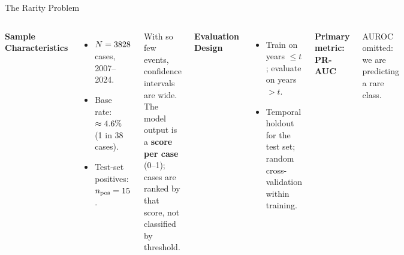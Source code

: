 \documentclass[10pt, aspectratio=169]{beamer}
\begin{document}
\begin{frame}{The Rarity Problem}
 \begin{columns}
 \textbf{Sample Characteristics}
 \begin{itemize}
 \item $N = 3828{}$ cases, 2007--2024.
 \item Base rate: $\approx4.6\%{}$ (1 in 38 cases).
 \item Test-set positives: $n_{\text{pos}} = 15{}$.
 \end{itemize}
 \vspace{0.8em}
 With so few events, confidence intervals are wide. The model output is a \textbf{score per case} (0--1); cases are ranked by that score, not classified by threshold.

 \textbf{Evaluation Design}
 \begin{itemize}
 \item Train on years $\leq t$; evaluate on years $> t$.
 \item Temporal holdout for the test set; random cross-validation within training.
 \end{itemize}
 \vspace{0.8em}
 \textbf{Primary metric: PR-AUC}

 \small AUROC omitted: we are predicting a rare class.
 \end{columns}
\end{frame}
\end{document}
